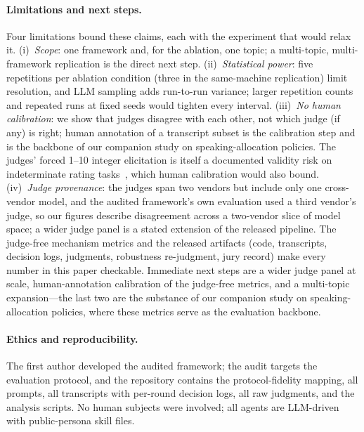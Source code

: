\paragraph{Limitations and next steps.}
Four limitations bound these claims, each with the experiment that
would relax it. (i)~\emph{Scope}: one framework and, for the ablation,
one topic; a multi-topic, multi-framework replication is the direct
next step. (ii)~\emph{Statistical power}: five repetitions per ablation
condition (three in the same-machine replication) limit resolution, and
LLM sampling adds run-to-run variance; larger repetition counts and
repeated runs at fixed seeds would tighten every interval. (iii)~\emph{No
human calibration}: we show that judges disagree with each other, not
which judge (if any) is right; human annotation of a transcript subset
is the calibration step and is the backbone of our companion study on
speaking-allocation policies. The judges' forced 1--10 integer
elicitation is itself a documented validity risk on indeterminate
rating tasks~\cite{guerdan2025validating}, which human calibration
would also bound. (iv)~\emph{Judge provenance}: the judges
span two vendors but include only one cross-vendor model, and the
audited framework's own evaluation used a third vendor's judge, so our
figures describe disagreement across a two-vendor slice of model space;
a wider judge panel is a stated extension of the released pipeline. The
judge-free mechanism metrics and the released artifacts (code,
transcripts, decision logs, judgments, robustness re-judgment, jury
record) make every number in this paper checkable. Immediate next steps
are a wider judge panel at scale, human-annotation calibration of the
judge-free metrics, and a multi-topic expansion---the last two are the
substance of our companion study on speaking-allocation policies, where
these metrics serve as the evaluation backbone.

\paragraph{Ethics and reproducibility.} The first author developed the
audited framework; the audit targets the evaluation protocol, and the
repository contains the protocol-fidelity mapping, all prompts, all
transcripts with per-round decision logs, all raw judgments, and the
analysis scripts. No human subjects were involved; all agents are
LLM-driven with public-persona skill files.
